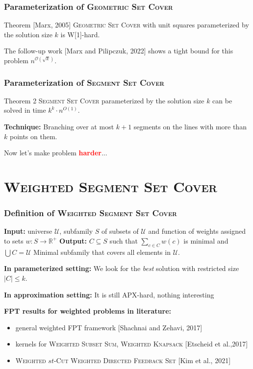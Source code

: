 \documentclass{beamer}
\begin{document}
\begin{frame}
\frametitle{Parameterization of \textsc{Geometric Set Cover}}
\begin{block}{Theorem [Marx, 2005]}
	\textsc{Geometric Set Cover} 
	with unit squares parameterized by the solution size $k$
	is W[1]-hard.
\end{block}

The follow-up work [Marx and Pilipczuk, 2022]
shows a tight bound for this problem $n^{\mathcal{O}(\sqrt{k})}$.

\end{frame}

\begin{frame}
\frametitle{Parameterization of \textsc{Segment Set Cover}}
\begin{block}{Theorem 2}
	\textsc{Segment Set Cover} parameterized by the solution size $k$
	can be solved in time $k^k \cdot n^{O(1)}$.
\end{block}

\textbf{Technique:} Branching over at most $k+1$
segments on the lines with more than $k$ points on them.

\pause

\bigskip

Now let's make problem \textcolor{red}{\textbf{harder}}...

\end{frame}

\section{\textsc{Weighted Segment Set Cover}} 

\begin{frame}
\frametitle{Definition of \textsc{Weighted Segment Set Cover}}

\textbf{Input:} universe $\mathcal{U}$,
subfamily $S$ of subsets of $\mathcal{U}$
and function of weights assigned to sets $w : S \rightarrow \mathbb{R^+}$
\newline
\textbf{Output:} $C \subseteq S$ such that $\sum_{c \in C} w(c)$ is minimal and
$\bigcup C = \mathcal{U}$
\newline
Minimal subfamily that covers all elements in $\mathcal{U}$.

\pause

\bigskip
\textbf{In parameterized setting:}
We look for the \textit{best} solution with restricted size $|C| \le k$.

\textbf{In approximation setting:}
It is still APX-hard, nothing interesting
\bigskip
\pause

\textbf{FPT results for weighted problems in literature:}
\begin{itemize}
\item general weighted FPT framework {[Shachnai and Zehavi, 2017]}
\item kernels for \textsc{Weighted Subset Sum}, \textsc{Weighted Knapsack} {[Etscheid et al.,2017]}
\item \textsc{Weighted $st$-Cut} \textsc{Weighted Directed Feedback Set} {[Kim et al., 2021]}
\end{itemize}


\end{frame}
\end{document}
